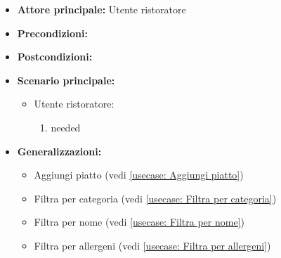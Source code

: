 \label{usecase:Lista dei piatti}
\begin{itemize}
\item \textbf{Attore principale:}  Utente ristoratore
\item \textbf{Precondizioni:}
\item \textbf{Postcondizioni:}
\item \textbf{Scenario principale:}
\begin{itemize}
\item  Utente ristoratore:
\begin{enumerate}
\item needed
\end{enumerate}
\end{itemize}
\item \textbf{Generalizzazioni:}
\begin{itemize}
\item  Aggiungi piatto (vedi \autoref{usecase: Aggiungi piatto})
\item  Filtra per categoria (vedi \autoref{usecase: Filtra per categoria})
\item  Filtra per nome (vedi \autoref{usecase: Filtra per nome})
\item  Filtra per allergeni (vedi \autoref{usecase: Filtra per allergeni})
\end{itemize}
\end{itemize}
